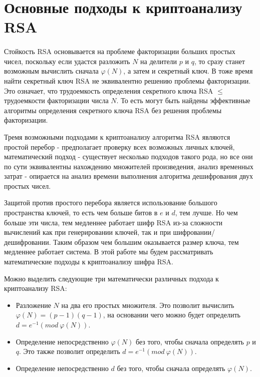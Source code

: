 
\section{Основные подходы к криптоанализу RSA}

  \paragraph{} Стойкость RSA основывается на проблеме факторизации больших простых чисел, поскольку если удастся разложить
  $N$ на делители $p$ и $q$, то сразу станет возможным вычислить сначала $\varphi(N)$, а затем и секретный ключ. 
  В тоже время найти секретный ключ RSA не эквивалентно решению проблемы факторизации. Это означает, что трудоемкость определения секретного ключа RSA $\le$ трудоемкости факторизации числа $N$. То есть могут быть найдены эффективные алгоритмы определения секретного ключа RSA без решения проблемы факторизации.
  
  Тремя возможными подходами к криптоанализу алгоритма RSA являются простой перебор - предполагает проверку всех возможных личных ключей, математический подход - существует несколько подходов такого рода, но все они по сути эквивалентны нахождению множителей произведения, анализ временных затрат - опирается на анализ времени выполнения алгоритма дешифрования двух простых чисел.
    
  Защитой против простого перебора является использование большого пространства ключей, то есть чем больше битов в $e$ и $d$, тем лучше. Но чем больше эти числа, тем медленнее работает шифр RSA из-за сложности вычислений как при генерировании ключей, так и при шифровании/дешифровании. Таким образом чем большим оказывается размер ключа, тем медленнее работает система. В этой работе мы будем рассматривать математические подходы к криптоанализу шифра RSA.
  
  Можно выделить следующие три математически различных подхода к криптоанализу RSA:
  
    \begin{itemize}
     \item Разложение $N$ на два его простых множителя. Это позволит вычислить $\varphi(N) = (p - 1)(q - 1)$, на основании чего можно будет 
     определить $d = e^{-1}(mod \: \varphi(N))$.
     \item Определение непосредственно $\varphi(N)$ без того, чтобы сначала определять $p$ и $q$. Это также позволит
     определить $d = e^{-1}(mod \: \varphi(N))$.
     \item Определение непосредственно $d$ без того, чтобы сначала определять $\varphi(N)$.
    \end{itemize}
    
